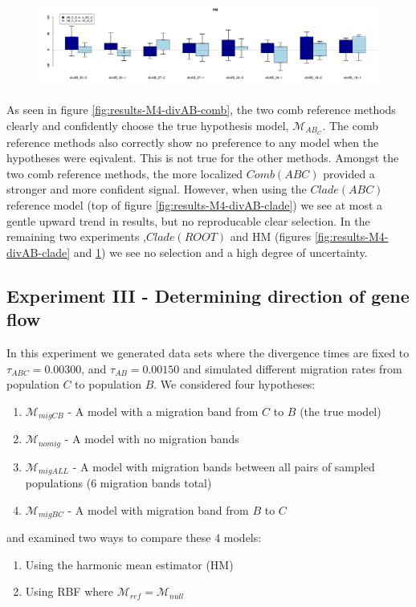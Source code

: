 \documentclass[11pt]{article}
\newcommand{\M}{\mathcal{M}}
\newcommand{\Mref}{\M_{ref}}
\newcommand{\1}{\mathbbm{1}}
\begin{document}
\begin{figure}[H]
\includegraphics[width=1.0\textwidth]{results/results-M4-divAB/M4-divAB-results-HM}
\caption{ }
\label{fig:results-M4-divAB-HM}
\end{figure}

As seen in figure \ref{fig:results-M4-divAB-comb}, the two comb reference methods clearly and confidently choose the true hypothesis model, $\M_{AB_C}$.
%
The comb reference methods also correctly show no preference to any model when the hypotheses were eqivalent. This is not true for the other methods.
%
Amongst the two comb reference methods, the more localized $Comb(ABC)$ provided a stronger and more confident signal.
%
However, when using the $Clade(ABC)$ reference model (top of figure \ref{fig:results-M4-divAB-clade}) we see at most a gentle upward trend in results, but no reproducable clear selection. 
%
In the remaining two experiments ,$Clade(ROOT)$ and HM (figures \ref{fig:results-M4-divAB-clade} and \ref{fig:results-M4-divAB-HM}) we see no selection and a high degree of uncertainty.



\subsection{Experiment III - Determining direction of gene flow}
In this experiment we generated data sets where the divergence times are fixed to $\tau_{ABC} = 0.00300$, and $\tau_{AB} = 0.00150$ and simulated different migration rates from population $C$ to population $B$.
%
We considered four hypotheses:
\begin{enumerate}

\item $\M_{migCB}$ - A model with a migration band from $C$ to $B$ (the true model)

\item $\M_{nomig}$ - A model with no migration bands

\item $\M_{migALL}$ - A model with migration bands between all pairs of sampled populations (6 migration bands total)

\item $\M_{migBC}$ - A model with migration band from $B$ to $C$

\end{enumerate}
%
and examined two ways to compare these 4 models:
\begin{enumerate}
\item Using the harmonic mean estimator (HM)
\item Using RBF where $\Mref = \M_{null}$

\end{enumerate}
\end{document}
